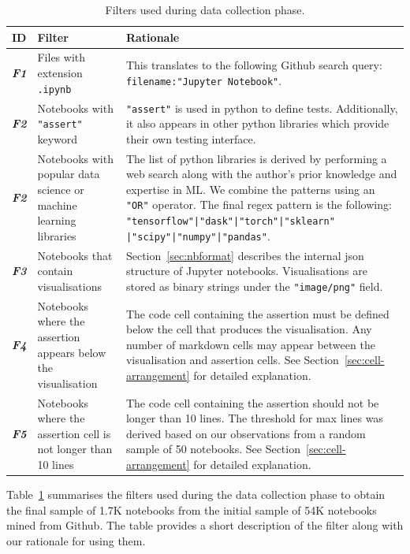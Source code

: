 \documentclass[acmsmall,screen,review,anonymous]{acmart}
\begin{document}
\begin{table}
  \centering
  \caption{Filters used during data collection phase.}
  \begin{tabular}{l p{} p{}}
    \toprule
    \textbf{ID} &
    \textbf{Filter} &
    \textbf{Rationale}\\
    \midrule
    \emph{\textbf{F1}} &
    Files with extension \texttt{.ipynb} &
    This translates to the following Github search query:
    \texttt{filename:"Jupyter Notebook"}.\\
    \emph{\textbf{F2}} &
    Notebooks with \texttt{"assert"} keyword &
    \texttt{"assert"} is used in python to define tests. Additionally,
    it also appears in other python libraries which provide their own
    testing interface.\\
    \emph{\textbf{F2}} &
    Notebooks with popular data science or machine learning libraries &
    The list of python libraries is derived by performing a web search
    along with the author's prior knowledge and expertise in ML. We
    combine the patterns using an \texttt{"OR"} operator. The final
    regex pattern is the following:
    \texttt{"tensorflow"|"dask"|"torch"|"sklearn"
    |"scipy"|"numpy"|"pandas"}.\\
    \emph{\textbf{F3}} &
    Notebooks that contain visualisations &
    Section~\ref{sec:nbformat} describes the internal json structure
    of Jupyter notebooks. Visualisations are stored as binary strings
    under the \texttt{"image/png"} field.\\
    \emph{\textbf{F4}} &
    Notebooks where the assertion appears below the visualisation &
    The code cell containing the assertion must be defined below the
    cell that produces the visualisation. Any number of markdown cells
    may appear between the visualisation and assertion cells. See
    Section~\ref{sec:cell-arrangement} for detailed explanation.\\
    \emph{\textbf{F5}} &
    Notebooks where the assertion cell is not longer than 10 lines &
    The code cell containing the assertion should not be longer than
    10 lines. The threshold for max lines was derived based on our
    observations from a random sample of 50 notebooks. See
    Section~\ref{sec:cell-arrangement} for detailed explanation.\\
    \bottomrule
  \end{tabular}
  \label{tab:filters}
\end{table}

Table~\ref{tab:filters} summarises the filters used during the data
collection phase to obtain the final sample of 1.7K notebooks from the
initial sample of 54K notebooks mined from Github. The table provides
a short description of the filter along with our rationale for using
them.
\end{document}
